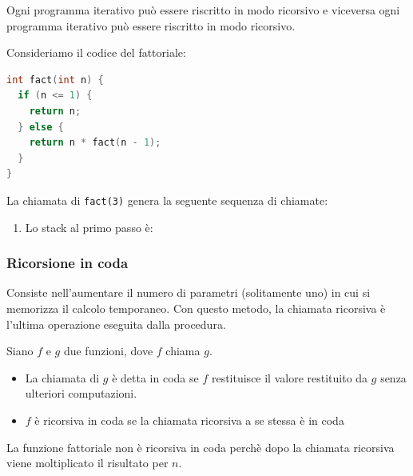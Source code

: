 \documentclass[a4paper]{article}
\begin{document}
\begin{theorem}
  Ogni programma iterativo può essere riscritto in modo ricorsivo e viceversa ogni
  programma iterativo può essere riscritto in modo ricorsivo.
\end{theorem}

\begin{example}
  Consideriamo il codice del fattoriale:
\begin{lstlisting}[language=c]
int fact(int n) {
  if (n <= 1) {
    return n;
  } else {
    return n * fact(n - 1);
  }
}
\end{lstlisting}
La chiamata di \texttt{fact(3)} genera la seguente sequenza di chiamate:
\begin{enumerate}
  \item Lo stack al primo passo è:
\end{enumerate}
\end{example}

\subsubsection{Ricorsione in coda}
Consiste nell'aumentare il numero di parametri (solitamente uno) in cui si memorizza
il calcolo temporaneo. Con questo metodo, la chiamata ricorsiva è l'ultima operazione
eseguita dalla procedura.

\begin{definition}
  Siano \( f \) e \( g \) due funzioni, dove \( f \) chiama \( g \).
  \begin{itemize}
    \item 
      La chiamata di \( g \) è detta in coda se \( f \) restituisce il valore restituito
      da \( g \) senza ulteriori computazioni.

    \item \( f \) è ricorsiva in coda se la chiamata ricorsiva a se stessa è in coda
  \end{itemize}
\end{definition}

\begin{example}
  La funzione fattoriale non è ricorsiva in coda perchè dopo la chiamata ricorsiva 
  viene moltiplicato il risultato per \( n \).
\end{example}
\end{document}
